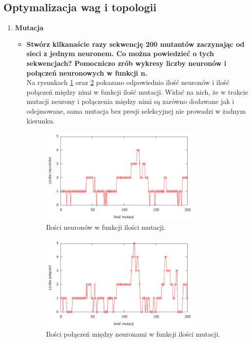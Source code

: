 \subsection{ Optymalizacja wag i topologii }

\begin{enumerate}
\item \textbf{Mutacja}
	\begin{itemize}
		\item \textbf{Stwórz kilkanaście razy sekwencję 200 mutantów zaczynając od sieci z jednym neuronem. Co można powiedzieć o tych sekwencjach? Pomocniczo zrób wykresy liczby neuronów i połączeń neuronowych w funkcji n.}
\\Na rysunkach \ref{fig:mutations-neurons} oraz \ref{fig:mutations-connections} pokazano odpowiednio ilość neuronów i ilość połączeń między nimi w funkcji ilość mutacji. Widać na nich, że w trakcie mutacji neurony i połączenia między nimi są zarówno dodawane jak i odejmowane, sama mutacja bez presji selekcyjnej nie prowadzi w żadnym kierunku.
		
	\begin{figure}[h]
	\centering
	\includegraphics[width=0.8\textwidth]{dane/part2/zad2/neurons}
	\caption{Ilości neuronów w funkcji ilości mutacji.\label{fig:mutations-neurons}}
	\end{figure}
	
		\begin{figure}[h]
	\centering
	\includegraphics[width=0.8\textwidth]{dane/part2/zad2/connections}
	\caption{Ilości połączeń między neuronami w funkcji ilości mutacji.\label{fig:mutations-connections}}
	\end{figure}
		

\end{itemize}
\end{enumerate}
